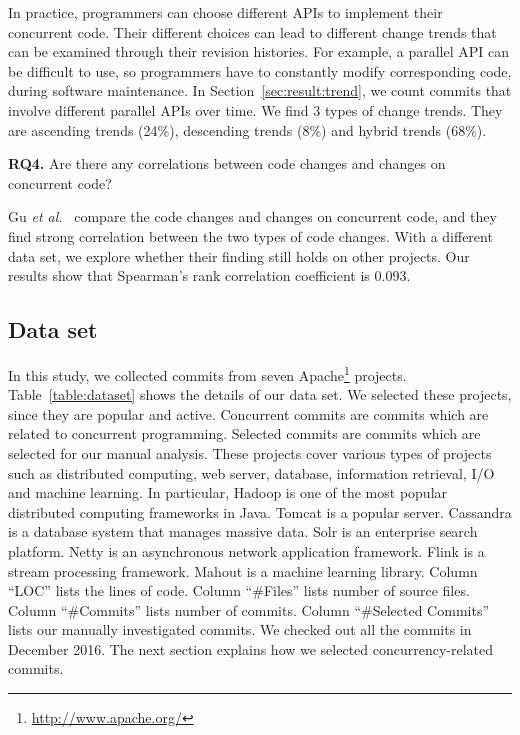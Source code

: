 In practice, programmers can choose different APIs to implement their concurrent code. Their different choices can lead to different change trends that can be examined through their revision histories. For example, a parallel API can be difficult to use, so programmers have to constantly modify corresponding code, during software maintenance. In Section~\ref{sec:result:trend}, we count commits that involve different parallel APIs over time. We find 3 types of change trends. They are ascending trends (24\%), descending trends (8\%) and hybrid trends (68\%).%

\textbf{RQ4.} Are there any correlations between code changes and changes on concurrent code?

Gu \emph{et al.}~\cite{conf/sigsoft/GuJSZL15} compare the code changes and changes on concurrent code, and they find strong correlation between the two types of code changes. With a different data set, we explore whether their finding still holds on other projects. Our results show that Spearman's rank correlation coefficient is 0.093.

\subsection{Data set}
\label{sec:method:data}
In this study, we collected commits from seven Apache\footnote{\url{http://www.apache.org/}} projects. Table~\ref{table:dataset} shows the details of our data set. We selected these projects, since they are popular and active. Concurrent commits are commits which are related to concurrent programming. Selected commits are commits which are selected for our manual analysis. These projects cover various types of projects such as distributed computing, web server, database, information retrieval, I/O and machine learning. In particular, Hadoop is one of the most popular distributed computing frameworks in Java. Tomcat is a popular server. Cassandra is a database system that manages massive data. Solr is an enterprise search platform. Netty is an asynchronous network application framework. Flink is a stream processing framework. Mahout is a machine learning library. Column ``LOC'' lists the lines of code. Column ``\#Files'' lists number of source files. Column ``\#Commits'' lists number of commits. Column ``\#Selected Commits'' lists our manually investigated commits. We checked out all the commits in December 2016. The next section explains how we selected concurrency-related commits.

